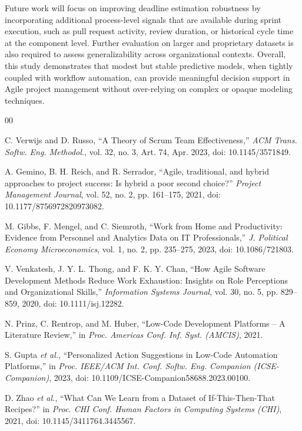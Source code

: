 \documentclass[conference]{IEEEtran}
\begin{document}
Future work will focus on improving deadline estimation robustness by incorporating additional process-level signals that are available during sprint execution, such as pull request activity, review duration, or historical cycle time at the component level. Further evaluation on larger and proprietary datasets is also required to assess generalizability across organizational contexts. Overall, this study demonstrates that modest but stable predictive models, when tightly coupled with workflow automation, can provide meaningful decision support in Agile project management without over-relying on complex or opaque modeling techniques.




\begin{thebibliography}{00}

C. Verwijs and D. Russo, ``A Theory of Scrum Team Effectiveness,''
\textit{ACM Trans. Softw. Eng. Methodol.}, vol. 32, no. 3, Art. 74, Apr. 2023,
doi: 10.1145/3571849.

A. Gemino, B. H. Reich, and R. Serrador, ``Agile, traditional, and hybrid approaches to project success: Is hybrid a poor second choice?''
\textit{Project Management Journal}, vol. 52, no. 2, pp. 161--175, 2021,
doi: 10.1177/8756972820973082.

M. Gibbs, F. Mengel, and C. Siemroth, ``Work from Home and Productivity: Evidence from Personnel and Analytics Data on IT Professionals,''
\textit{J. Political Economy Microeconomics}, vol. 1, no. 2, pp. 235--275, 2023,
doi: 10.1086/721803.

V. Venkatesh, J. Y. L. Thong, and F. K. Y. Chan, ``How Agile Software Development Methods Reduce Work Exhaustion: Insights on Role Perceptions and Organizational Skills,''
\textit{Information Systems Journal}, vol. 30, no. 5, pp. 829--859, 2020,
doi: 10.1111/isj.12282.

N. Prinz, C. Rentrop, and M. Huber, ``Low-Code Development Platforms -- A Literature Review,''
in \textit{Proc. Americas Conf. Inf. Syst. (AMCIS)}, 2021.

S. Gupta \textit{et al.}, ``Personalized Action Suggestions in Low-Code Automation Platforms,''
in \textit{Proc. IEEE/ACM Int. Conf. Softw. Eng. Companion (ICSE-Companion)}, 2023,
doi: 10.1109/ICSE-Companion58688.2023.00100.

D. Zhao \textit{et al.}, ``What Can We Learn from a Dataset of If-This-Then-That Recipes?''
in \textit{Proc. CHI Conf. Human Factors in Computing Systems (CHI)}, 2021,
doi: 10.1145/3411764.3445567.


\end{thebibliography}
\end{document}
